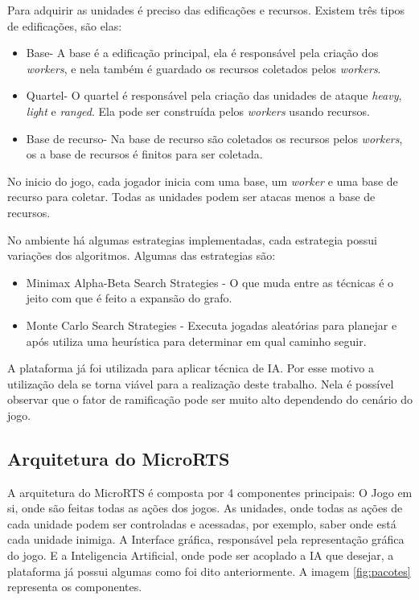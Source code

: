 Para adquirir as unidades é preciso das edificações e recursos. Existem três tipos de edificações, são elas:

\begin{itemize}
	\item Base- A base é a edificação principal, ela é responsável pela criação dos \textit{workers}, e nela também é guardado os recursos coletados pelos \textit{workers}. 
	\item Quartel- O quartel é responsável pela criação das unidades de ataque \textit{heavy}, \textit{light} e \textit{ranged}. Ela pode ser construída pelos \textit{workers} usando recursos.
	\item Base de recurso- Na base de recurso são coletados os recursos pelos \textit{workers}, os a base de recursos é finitos para ser coletada.
\end{itemize}  

No inicio do jogo, cada jogador inicia com uma base, um \textit{worker} e uma base de recurso para coletar. Todas as unidades podem ser atacas menos a base de recursos. 
 
No ambiente há algumas estrategias implementadas, cada estrategia possui variações dos algoritmos. Algumas das estrategias são:
 \begin{itemize}
 	\item Minimax Alpha-Beta Search Strategies - O que muda entre as técnicas é o jeito com que é feito a expansão do grafo.
 	\item Monte Carlo Search Strategies - Executa jogadas aleatórias para planejar e após utiliza uma heurística para determinar em qual caminho seguir.
 \end{itemize}
 
 A plataforma já foi utilizada para aplicar técnica de IA. Por esse motivo a utilização dela se torna viável para a realização deste trabalho. 
Nela é possível observar que o fator de ramificação pode ser muito alto dependendo do cenário do jogo.

\subsection{Arquitetura do MicroRTS}

A arquitetura do MicroRTS é composta por 4 componentes principais: O Jogo em si, onde são feitas todas as ações dos jogos. As unidades, onde todas as ações de cada unidade podem ser controladas e acessadas, por exemplo, saber onde está cada unidade inimiga. A Interface gráfica, responsável pela representação gráfica do jogo. E a Inteligencia Artificial, onde pode ser acoplado a IA que desejar, a plataforma já possui algumas como foi dito anteriormente. A imagem \ref{fig:pacotes} representa os componentes.

